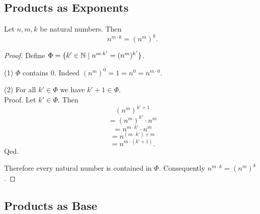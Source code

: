 \documentclass[10pt]{article}
\begin{document}
  \subsection{Products as Exponents}

  \begin{forthel}
    \begin{proposition}
      Let $n, m, k$ be natural numbers.
      Then \[ n^{m \cdot k} = (n^{m})^{k}. \]
    \end{proposition}
    \begin{proof}
      Define $\Phi = \{ k' \in \mathbb{N} \mid n^{m \cdot k'} = (n^{m})^{k'} \}$.

      (1) $\Phi$ contains $0$.
      Indeed $(n^{m})^{0}
        = 1
        = n^{0}
        = n^{m \cdot 0}$.

      (2) For all $k' \in \Phi$ we have $k' + 1 \in \Phi$. \\
      Proof.
        Let $k' \in \Phi$.
        Then
        \[  (n^{m})^{k' + 1}                \]
        \[    = (n^{m})^{k'} \cdot n^{m}    \]
        \[    = n^{m \cdot k'} \cdot n^{m}  \]
        \[    = n^{(m \cdot k') + m}        \]
        \[    = n^{m \cdot (k' + 1)}.       \]
      Qed.

      Therefore every natural number is contained in $\Phi$.
      Consequently $n^{m \cdot k} = (n^{m})^{k}$.
    \end{proof}
  \end{forthel}


  \subsection{Products as Base}
\end{document}
